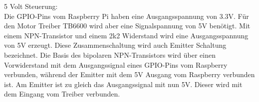5 Volt Steuerung:\label{sec: 5V}\\
\vspace{2mm}
Die GPIO-Pins vom Raspberry Pi haben eine Ausgangsspannung von 3.3V. Für den Motor Treiber TB6600 wird aber eine Signalspannung von 5V benötigt. Mit einem NPN-Transistor und einem 2k2 Widerstand wird eine Ausgangsspannung von 5V erzeugt. Diese Zusammenschaltung wird auch Emitter Schaltung bezeichnet. Die Basis des bipolaren NPN-Transistors wird über einen Vorwiderstand mit dem Ausgangssignal eines GPIO-Pins vom Raspberry verbunden, während der Emitter mit dem 5V Ausgang vom Raspberry verbunden ist. Am Emitter ist zu gleich das Ausgangssignal mit nun 5V. Dieser wird mit dem Eingang vom Treiber verbunden. 